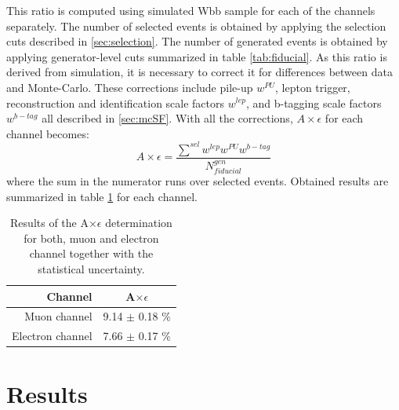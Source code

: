 This ratio is computed using simulated Wbb sample for each of the channels separately. The number of selected events is obtained by applying the selection cuts described in \ref{sec:selection}. The number of generated events is obtained by applying generator-level cuts summarized in table \ref{tab:fiducial}. As this ratio is derived from simulation, it is necessary to correct it for differences between data and Monte-Carlo. These corrections include pile-up  $w^{PU}$, lepton trigger, reconstruction and identification scale factors $w^{lep}$, and b-tagging scale factors $w^{b-tag}$ all described in \ref{sec:mcSF}. With all the corrections, $A\times \epsilon$ for each channel becomes:
\begin{equation}
A\times \epsilon = \frac{\sum^{sel} w^{lep} w^{PU} w^{b-tag}}{N_{fiducial}^{gen}}
\end{equation}
where the sum in the numerator runs over selected events.
Obtained results are summarized in table \ref{tab:AE} for each channel.

\begin{table}[!htb]
\begin{center}
   \begin{tabular} {r c} \hline \hline
        Channel         & A$\times \epsilon$ \\
        \hline
        Muon channel         & 9.14 $\pm$ 0.18 $\%$ \\
        Electron channel     & 7.66 $\pm$ 0.17 $\%$ \\
        \hline\hline
   \end{tabular}
\caption{Results of the A$\times \epsilon$ determination for both, muon and electron channel together with the statistical uncertainty.}
\label{tab:AE}
\end{center}
\end{table}




\section{Results}
\label{sec:res}

